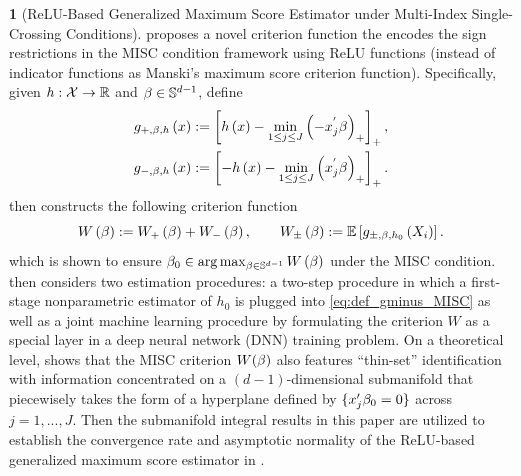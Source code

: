\documentclass[12pt,american]{article}
\theoremstyle{definition}
\newtheorem{example}{\protect\examplename}
\theoremstyle{plain}
\theoremstyle{definition}
\theoremstyle{plain}
\theoremstyle{plain}
\theoremstyle{plain}
\theoremstyle{plain}
\theoremstyle{plain}
\newcommand{\R}{\mathbb{R}}
\newcommand{\E}{\mathbb{E}}
\providecommand{\examplename}{Example}
\providecommand{\examplename}{Example}
\begin{document}
\begin{example}[ReLU-Based Generalized Maximum Score Estimator under Multi-Index Single-Crossing Conditions]
  \cite*{CGW2025} proposes a novel criterion function the encodes the sign restrictions in the MISC condition framework using ReLU functions (instead of indicator functions as Manski's maximum score criterion function). Specifically, given $h:{\cal X}\to\R$ and $\beta\in \mathbb{S}^{d-1}$, define
  \begin{align}
    g_{+,\beta,h}\left(x\right) & :=\left[h\left(x\right)-\min_{1\le j\le J}\left(-x_{j}^{'}\beta\right)_{+}\right]_{+},\nonumber\\
    g_{-,\beta,h}\left(x\right) & :=\left[-h\left(x\right)-\min_{1\le j\le J}\left(x_{j}^{'}\beta\right)_{+}\right]_{+}.\label{eq:def_gminus_MISC}
  \end{align}
  \cite*{CGW2025} then constructs the following criterion function
  \[
    W\left(\b\right):=W_{+}\left(\b\right)+W_{-}\left(\b\right),\qquad W_{\pm}\left(\b\right):=\E\left[g_{\pm,\b,h_{0}}\left(X_{i}\right)\right].
  \]
  which is shown to ensure $\beta_{0}\in\arg\max_{\beta\in \mathbb{S}^{d-1}}W\left(\beta\right)$ under the MISC condition. \cite*{CGW2025} then considers two estimation procedures: a two-step procedure in which a first-stage nonparametric estimator of $h_0$ is plugged into \eqref{eq:def_gminus_MISC} as well as a joint machine learning procedure by formulating the criterion $W$ as a special layer in a deep neural network (DNN) training problem. On a theoretical level, \cite*{CGW2025} shows that the MISC criterion $W(\beta)$ also features ``thin-set'' identification with information concentrated on a $(d-1)$-dimensional submanifold that piecewisely takes the form of a hyperplane defined by $\{x_j'\beta_0=0\}$ across $j=1,...,J$. Then the submanifold integral results in this paper are utilized to establish the convergence rate and asymptotic normality of the ReLU-based generalized maximum score estimator in \cite*{CGW2025}.

\end{example}
\end{document}
